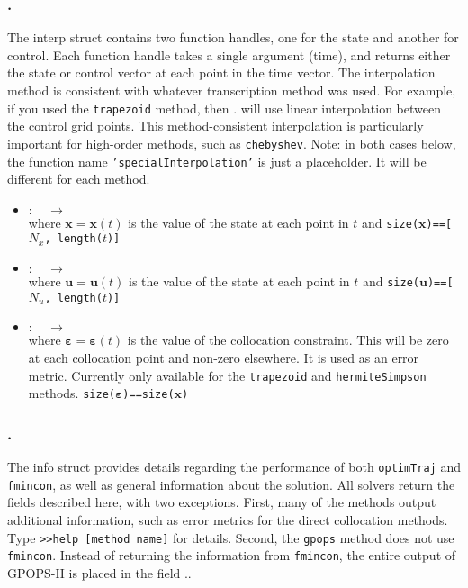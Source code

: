 \subsubsection*{.}
The interp struct contains two function handles, one for the state and another for control. Each function handle takes a single argument (time), and returns either the state or control vector at each point in the time vector. The interpolation method is consistent with whatever transcription method was used. For example, if you used the \texttt{trapezoid} method, then . will use linear interpolation between the control grid points. This method-consistent interpolation is particularly important for high-order methods, such as \texttt{chebyshev}. Note: in both cases below, the function name \texttt{'specialInterpolation'} is just a placeholder. It will be different for each method.
\begin{itemize}
\item {}
	${\bm: \quad \to \quad }$
	\\ where $\bm{x} = \bm{x}(t)$ is the value of the state at each point in $t$ and \texttt{size($\bm{x}$)==[$N_x$, length($t$)]}
\item {}
	${\bm: \quad \to \quad }$
	\\ where $\bm{u} = \bm{u}(t)$ is the value of the state at each point in $t$ and \texttt{size($\bm{u}$)==[$N_u$, length($t$)]}
\item {}
	${\bm: \quad \to \quad }$
	\tc{$\bm{\varepsilon}$ = }
	\\ where $\bm{\varepsilon} = \bm{\varepsilon}(t)$ is the value of the collocation constraint. This will be zero at each collocation point and non-zero elsewhere. It is used as an error metric. Currently only available for the \texttt{trapezoid} and \texttt{hermiteSimpson} methods.  \texttt{size($\bm{\varepsilon}$)==size($\bm{x}$)}
\end{itemize}



\subsubsection*{.}

The info struct provides details regarding the performance of both \texttt{optimTraj} and \texttt{fmincon}, as well as general information about the solution. All solvers return the fields described here, with two exceptions. First, many of the methods output additional information, such as error metrics for the direct collocation methods. Type \texttt{>>help [method name]} for details. Second, the \texttt{gpops} method does not use \texttt{fmincon}. Instead of returning the information from \texttt{fmincon}, the entire output of GPOPS-II is placed in the field ..

